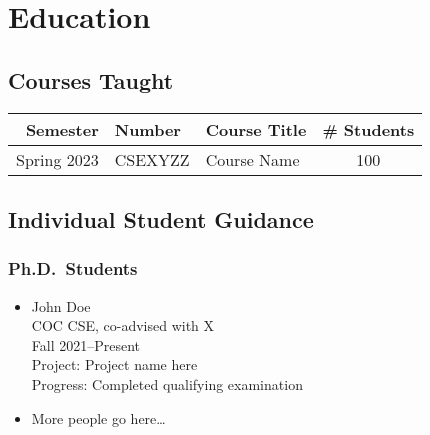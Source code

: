 \section{Education}
\begin{adjustwidth}{2em}{0pt}

\subsection{Courses Taught}

\begin{center}
    \begin{tabular}{ r l l c }
        \hline\hline
        \bf Semester  &\bf Number & \bf Course Title & \bf \# Students \\
        \hline
        Spring 2023 & CSEXYZZ & Course Name & 100 \\
        \hline\hline
    \end{tabular}
\end{center}

\subsection{Individual Student Guidance}


\subsubsection{Ph.D.\ Students}

\begin{itemize}
    \item 
        John Doe \\ 
        COC CSE, co-advised with X\\
        Fall 2021--Present \\
        Project: Project name here \\
        Progress: Completed qualifying examination
    \item More people go here\dots
\end{itemize}


\end{adjustwidth}
